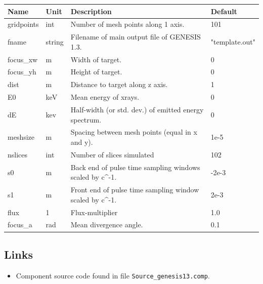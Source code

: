 \begin{longtable}{p{}p{}p{}p{}}
\toprule
\textbf{Name} & \textbf{Unit} & \textbf{Description} & \textbf{Default} \\
\midrule
\endhead
gridpoints & int & Number of mesh points along 1 axis. & 101 \\
fname & string & Filename of main output file of GENESIS 1.3. & "template.out" \\
focus\_xw & m & Width of target. & 0 \\
focus\_yh & m & Height of target. & 0 \\
dist & m & Distance to target along z axis. & 1 \\
E0 & keV & Mean energy of xrays. & 0 \\
dE & kev & Half-width (or std. dev.) of emitted energy spectrum. & 0 \\
meshsize & m & Spacing between mesh points (equal in x and y). & 1e-5 \\
nslices & int & Number of slices simulated & 102 \\
s0 & m & Back end of pulse time sampling windows scaled by c\textasciicircum{}-1. & -2e-3 \\
s1 & m & Front end of pulse time sampling window scaled by c\textasciicircum{}-1. & 2e-3 \\
flux & 1 & Flux-multiplier & 1.0 \\
focus\_a & rad & Mean divergence angle. & 0.1 \\
\bottomrule
\end{longtable}

\subsection*{Links}
\begin{itemize}
  \item Component source code found in file \texttt{Source\_genesis13.comp}.
\end{itemize}
